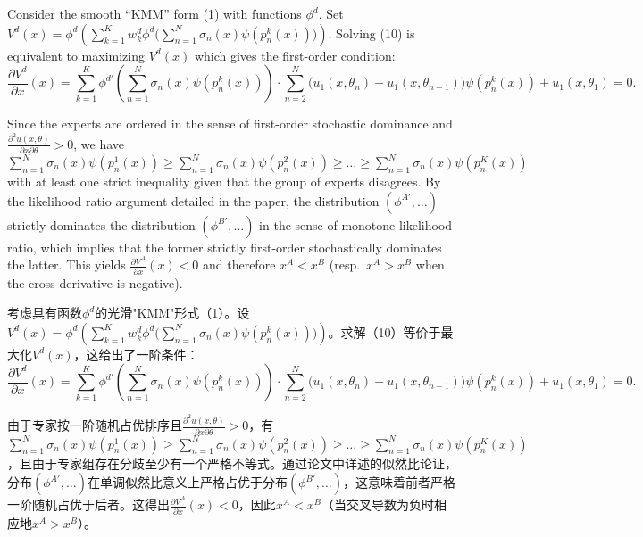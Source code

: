 \documentclass[12pt,a4paper]{article}
\newenvironment{original}
  {\par\noindent\ignorespaces}
  {\par}
\newenvironment{translation}
  {\par\noindent{\color{transblue}\ignorespaces}}
  {\par\medskip}
\begin{document}
\begin{original}
Consider the smooth ``KMM'' form (1) with functions $\phi^{d}$. Set $V^{d}(x) = \phi^{d}\!\left(\sum_{k=1}^{K} w^{d}_{k} \phi^{d}\!\big(\sum_{n=1}^{N} \sigma_{n}(x) \psi(p^{k}_{n}(x))\big)\right)$. Solving (10) is equivalent to maximizing $V^{d}(x)$ which gives the first-order condition:
\[
\frac{\partial V^{d}}{\partial x}(x) = \sum_{k=1}^{K} \phi^{d\prime}\!\left( \sum_{n=1}^{N} \sigma_{n}(x) \psi(p^{k}_{n}(x)) \right) \cdot \sum_{n=2}^{N} \Big(u_{1}(x, \theta_{n}) - u_{1}(x, \theta_{n-1})\Big) \psi(p^{k}_{n}(x)) + u_{1}(x, \theta_{1}) = 0. \tag{C.4}
\]

Since the experts are ordered in the sense of first-order stochastic dominance and $\frac{\partial^{2} u(x,\theta)}{\partial x \partial \theta} > 0$, we have $\sum_{n=1}^{N} \sigma_{n}(x) \psi(p^{1}_{n}(x)) \geq \sum_{n=1}^{N} \sigma_{n}(x) \psi(p^{2}_{n}(x)) \geq \dots \geq \sum_{n=1}^{N} \sigma_{n}(x) \psi(p^{K}_{n}(x))$ with at least one strict inequality given that the group of experts disagrees. By the likelihood ratio argument detailed in the paper, the distribution $(\phi^{A\prime}, \dots)$ strictly dominates the distribution $(\phi^{B\prime}, \dots)$ in the sense of monotone likelihood ratio, which implies that the former strictly first-order stochastically dominates the latter. This yields $\frac{\partial V^{A}}{\partial x}(x) < 0$ and therefore $x^{A} < x^{B}$ (resp.\ $x^{A} > x^{B}$ when the cross-derivative is negative).
\end{original}

\begin{translation}
考虑具有函数$\phi^{d}$的光滑"KMM"形式（1）。设$V^{d}(x) = \phi^{d}\!\left(\sum_{k=1}^{K} w^{d}_{k} \phi^{d}\!\big(\sum_{n=1}^{N} \sigma_{n}(x) \psi(p^{k}_{n}(x))\big)\right)$。求解（10）等价于最大化$V^{d}(x)$，这给出了一阶条件：
\[
\frac{\partial V^{d}}{\partial x}(x) = \sum_{k=1}^{K} \phi^{d\prime}\!\left( \sum_{n=1}^{N} \sigma_{n}(x) \psi(p^{k}_{n}(x)) \right) \cdot \sum_{n=2}^{N} \Big(u_{1}(x, \theta_{n}) - u_{1}(x, \theta_{n-1})\Big) \psi(p^{k}_{n}(x)) + u_{1}(x, \theta_{1}) = 0. \tag{C.4}
\]

由于专家按一阶随机占优排序且$\frac{\partial^{2} u(x,\theta)}{\partial x \partial \theta} > 0$，有$\sum_{n=1}^{N} \sigma_{n}(x) \psi(p^{1}_{n}(x)) \geq \sum_{n=1}^{N} \sigma_{n}(x) \psi(p^{2}_{n}(x)) \geq \dots \geq \sum_{n=1}^{N} \sigma_{n}(x) \psi(p^{K}_{n}(x))$，且由于专家组存在分歧至少有一个严格不等式。通过论文中详述的似然比论证，分布$(\phi^{A\prime}, \dots)$在单调似然比意义上严格占优于分布$(\phi^{B\prime}, \dots)$，这意味着前者严格一阶随机占优于后者。这得出$\frac{\partial V^{A}}{\partial x}(x) < 0$，因此$x^{A} < x^{B}$（当交叉导数为负时相应地$x^{A} > x^{B}$）。
\end{translation}
\end{document}
